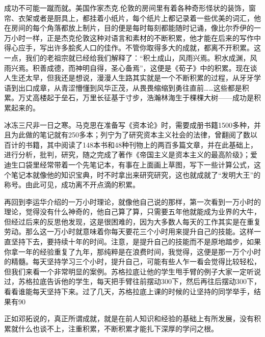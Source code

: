 \documentclass{article}
\begin{document}
成功不可能一蹴而就。美国作家杰克.伦敦的房间里有着各种奇形怪状的装饰，窗帘、衣架或者是厨具上，都挂着小纸片，每个纸片上都记录着一些优美的词汇，他在房间的每个角落都放上制片，目的便是每时每刻都能随时记诵，像比尔乔伊的一万小时一样，正是杰克伦敦这种对语言和素材的不断积累，他才能在后来的写作中得心应手，写出许多脍炙人口的佳作。不管你取得多大的成就，都离不开积累。这一点，我们的老祖宗就已经给我们解释了：“积土成山，风雨兴焉。积水成渊，风雨兴焉。积善成德，而神明自得，圣心备焉”，这便是《荀子》中的积累。现在谈人生还太早，但我还是想说，漫漫人生路其实就是一个不断积累的过程，从牙牙学语到出口成章，从青涩懵懂到风华正茂，从畏畏缩缩到勇往直前……这些都是积累。万丈高楼起于垒石，万里长征基于寸步，浩瀚林海生于棵棵大树——成功是积累起来的。


冰冻三尺非一日之寒。马克思在准备写《资本论》时，需要成册书籍1500多种，并且为此做的笔记就有250多本；列宁为了研究资本主义社会的法律，曾翻阅了数以百计的书籍，其中阅读了148本书和48种刊物上的两百多篇文章，并在此基础上，进行分析，批判，研究，随之完成了著作《帝国主义是资本主义的最高阶级》；爱迪生口袋里经常带着一个先笔记本，有事在上面画上草图，写下一些计算公式，这个笔记本就像他的知识宝典，时不时拿出来研究研究，这也就成就了“发明大王”的称号。由此可见，成功离不开点滴的积累。


再回到李运华介绍的一万小时理论，就像他自己说的那样，第一次看到一万小时的理论，觉得没有什么神奇的，他自己算了算，只需要五年他就能成为业界的大牛，但经过后来的反思他发现，这是很困难的，因为大多数人每天的工作其实是在重复劳动。那么这一万小时就意味着你每天要花三个小时用来提升自己的技能。这样一直坚持下去，要持续十年的时间。注意，是提升自己的技能而不是原地踏步，如果你拿一年的经验重复了九年，那纯粹是在浪费时间，我觉得，这便是那一万个小时的精髓。每天坚持学习三个小时，提升自己，可能有些人乍一看会觉得比较轻松，但我们来看一个非常明显的案例。苏格拉底让他的学生甩手臂的例子大家一定听说过，苏格拉底告诉他的学生，每天把手臂往前摆动300下，然后再往后摆动300下，看看谁能每天坚持下来。过了几天，苏格拉底上课的时候的让坚持的同学举手，结果有90%


正如邓拓说的，真正所谓成就，就是在前人知识和经验的基础上有所发展，没有积累就什么也谈不上，注重积累，不断积累才能扎下深厚的学问之根。
\end{document}
